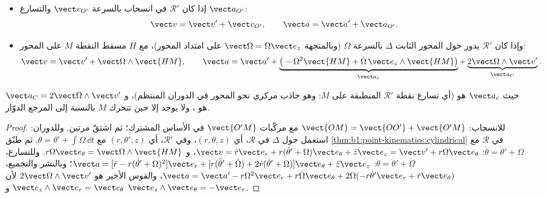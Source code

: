\begin{theorem}\label{thm:b1:non-inertial-frames:composition}
\begin{itemize}
  \item إذا كان $\mathcal R'$ في انسحاب بالسرعة $\vect v_{O'}$ والتسارع
        $\vect a_{O'}$:
        \[
        \vect v = \vect v' + \vect v_{O'}, \qquad \vect a = \vect a' + \vect a_{O'} .
        \]
  \item وإذا كان $\mathcal R'$ يدور حول المحور الثابت $\Delta$ بالسرعة $\Omega$ (وبالمتجهة
        $\vect\Omega = \Omega\vect e_z$ على امتداد المحور)، مع $H$ مسقط
        النقطة $M$ على المحور:
        \[
        \vect v = \vect v' + \vect\Omega\wedge\vect{HM}, \qquad
        \vect a = \vect a' + \underbrace{\big(-\Omega^2\vect{HM} + \dot\Omega\,\vect e_z\wedge\vect{HM}\big)}_{\vect a_e}
        + \underbrace{2\vect\Omega\wedge\vect v'}_{\vect a_C} .
        \]
\end{itemize}
حيث $\vect a_e$ هو \emph{} (أي تسارع
نقطة $\mathcal R'$ المنطبقة على $M$: وهو جاذب مركزي نحو المحور
في الدوران المنتظم)، و $\vect a_C = 2\vect\Omega\wedge\vect v'$ هو
\emph{}، ولا يوجد إلا حين تتحرك $M$ بالنسبة إلى
المرجع الدوّار.
\end{theorem}

\begin{proof}
للانسحاب: $\vect{OM} = \vect{OO'} + \vect{O'M}$ مع مركّبات
$\vect{O'M}$ في الأساس المشترك؛ ثم اشتقّ مرتين. وللدوران: استعمل
 حول $\Delta$ في $\mathcal R$، أي $(r, \theta, z)$،
وفي $\mathcal R'$، أي $(r, \theta', z)$ مع $\theta = \theta' + \int\Omega\,\dd t$.
ثم طبّق \cref{thm:b1:point-kinematics:cylindrical} في $\mathcal R$ مع
$\dot\theta = \dot\theta' + \Omega$:
$\vect v = \dot r\vect e_r + r(\dot\theta' + \Omega)\vect e_\theta + \dot z\vect e_z
= \vect v' + r\Omega\vect e_\theta$، و $r\Omega\vect e_\theta = \vect\Omega\wedge\vect{HM}$.
وللتسارع، $\ddot\theta = \ddot\theta' + \dot\Omega$:
$\vect a = [\ddot r - r(\dot\theta' + \Omega)^2]\vect e_r + [r(\ddot\theta' + \dot\Omega)
+ 2\dot r(\dot\theta' + \Omega)]\vect e_\theta + \ddot z\vect e_z$؛ وبالنشر
والتجميع، $\vect a = \vect a' - r\Omega^2\vect e_r + r\dot\Omega\vect e_\theta
+ 2\Omega(-r\dot\theta'\vect e_r + \dot r\vect e_\theta)$، والقوس الأخير هو
$2\vect\Omega\wedge\vect v'$ لأن $\vect e_z\wedge\vect e_r = \vect e_\theta$ و
$\vect e_z\wedge\vect e_\theta = -\vect e_r$.
\end{proof}

